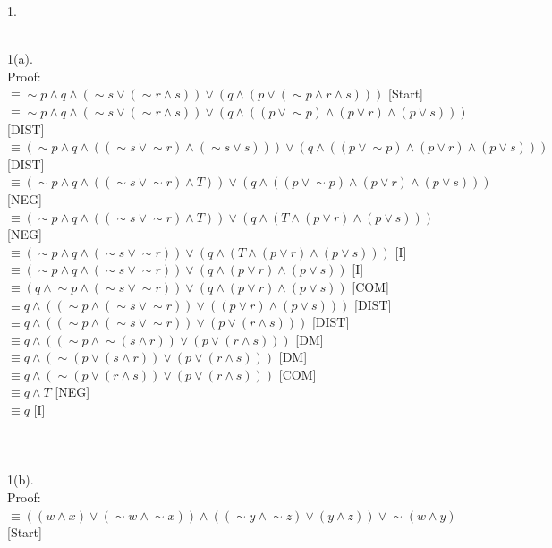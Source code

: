 \documentclass[a4paper, 20pt]{article}
\def\lnot{\mathop{\sim}}
\begin{document}
\newpage
\begin{question}{1.}

\newpage
\\1(a).
\\ Proof:
\\ $\equiv \lnot p \land q \land (\lnot s \lor (\lnot r \land s)) \lor (q \land(p \lor (\lnot p \land r \land s)))$ [Start]
\\ $\equiv \lnot p \land q \land (\lnot s \lor (\lnot r \land s)) \lor (q \land((p \lor \lnot p) \land(p \lor r) \land(p \lor s)))$ [DIST]
\\ $\equiv (\lnot p \land q \land ((\lnot s \lor \lnot r) \land (\lnot s \lor s))) \lor (q \land((p \lor \lnot p) \land(p \lor r) \land(p \lor s)))$ [DIST]
\\ $\equiv (\lnot p \land q \land ((\lnot s \lor \lnot r) \land T)) \lor (q \land((p \lor \lnot p) \land(p \lor r) \land(p \lor s)))$ [NEG]
\\ $\equiv (\lnot p \land q \land ((\lnot s \lor \lnot r) \land T)) \lor (q \land(T \land(p \lor r) \land(p \lor s)))$ [NEG]
\\ $\equiv (\lnot p \land q \land (\lnot s \lor \lnot r)) \lor (q \land(T \land(p \lor r) \land(p \lor s)))$ [I]
\\ $\equiv (\lnot p \land q \land (\lnot s \lor \lnot r)) \lor (q \land(p \lor r) \land(p \lor s))$ [I]
\\ $\equiv (q \land \lnot p \land (\lnot s \lor \lnot r)) \lor (q \land(p \lor r) \land(p \lor s))$ [COM]
\\ $\equiv q \land ((\lnot p \land (\lnot s \lor \lnot r)) \lor ((p \lor r) \land(p \lor s)))$ [DIST]
\\ $\equiv q \land ((\lnot p \land (\lnot s \lor \lnot r)) \lor (p \lor (r \land s)))$ [DIST]
\\ $\equiv q \land ((\lnot p \land \lnot (s \land r)) \lor (p \lor (r \land s)))$ [DM]
\\ $\equiv q \land (\lnot (p \lor (s \land r)) \lor (p \lor (r \land s)))$ [DM]
\\ $\equiv q \land (\lnot (p \lor (r \land s)) \lor (p \lor (r \land s)))$ [COM]
\\ $\equiv q \land T$ [NEG]
\\ $\equiv q$ [I]
\\ \boxed{}
\\
\\
\\1(b).
\\ Proof:
\\ $\equiv ((w \land x)\lor(\lnot w \land \lnot x))\land((\lnot y \land \lnot z)\lor(y \land z))\lor \lnot(w \land y)$ [Start]

\end{question}
\end{document}
